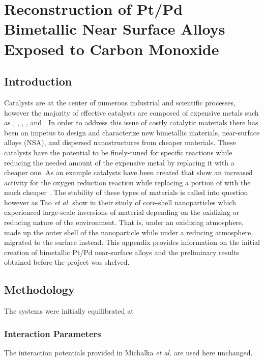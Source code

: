 
\chapter{Reconstruction of Pt/Pd Bimetallic Near Surface Alloys Exposed to Carbon Monoxide}


\section{Introduction}


Catalysts are at the center of numerous industrial and scientific processes,
however the majority of effective catalysts are composed of expensive metals
such as , , , , and .  In order to address
this issue of costly catalytic materials there has been an impetus to design
and characterize new bimetallic materials,\citep{Yu:2012by, Han:2015qr}
near-surface alloys (NSA),\citep{Jan-Kundsen:2007fe, Stephens:2011bv} and
dispersed nanostructures\citep{Shibata:2002hh,Kugai:2011rt} from cheaper
materials.  These catalysts have the potential to be finely-tuned for specific
reactions while reducing the needed amount of the expensive metal by replacing
it with a cheaper one. As an example  catalysts have been created
that show an increased activity for the oxygen reduction reaction while
replacing a portion of  with the much cheaper
.\cite{Stamenkovic:2007kk,Tuaev:2013fk} The stability of these types of
materials is called into question however as Tao {\em et al.} show in their
study of  core-shell nanoparticles which experienced large-scale
inversions of material depending on the oxidizing or reducing nature of the
environment.\citep{Tao:2008aa} That is, under an oxidizing atmosphere, 
made up the outer shell of the nanoparticle while under a reducing atmosphere,
 migrated to the surface instead. This appendix provides information on
the initial creation of bimetallic Pt/Pd near-surface alloys and the
preliminary results obtained before the project was shelved.

\section{Methodology}
The systems were initially equilibrated at 

\subsection{Interaction Parameters}
The interaction potentials provided in Michalka {\em et
al.}\citep{Michalka:2015aa} are used here unchanged.





